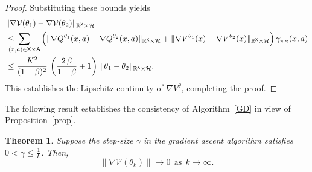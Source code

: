 \documentclass[11pt]{article}
\newcommand{\R}{\mathbb{R}}
\newcommand{\sX}{{\mathsf X}}
\newcommand{\sA}{{\mathsf A}}
\newcommand{\cH}{{\mathcal H}}
\newcommand{\V}{{\mathcal V}}
\newtheorem{theorem}{Theorem}[section]
\begin{document}
\begin{proof}
Substituting these bounds yields
\begin{align*}
&\|\nabla \V(\theta_1) - \nabla \V(\theta_2)\|_{\R^{\sX} \times \cH} \\
&\leq \hspace{-10pt} \sum_{(x,a) \in \sX \times \sA} \Big(\|\nabla Q^{\theta_1}(x,a) - \nabla Q^{\theta_2}(x,a)\|_{\R^{\sX} \times \cH} + \|\nabla V^{\theta_1}(x) - \nabla V^{\theta_2}(x)\|_{\R^{\sX} \times \cH}\Big) \, \gamma_{\pi_E}(x,a) \\
&\leq \frac{K^2}{(1-\beta)^2} \, \left(\frac{2  \, \beta}{1-\beta} + 1 \right) \, \| \theta_1 - \theta_2 \|_{\R^{\sX} \times \cH}.
\end{align*}
This establishes the Lipschitz continuity of $\nabla V^{\theta}$, completing the proof.
\end{proof}

The following result establishes the consistency of Algorithm~\ref{GD} in view of Proposition~\ref{prop}.

\begin{theorem}
Suppose the step-size $\gamma$ in the gradient ascent algorithm satisfies  $0<\gamma \leq \frac{1}{L}$. Then,
$$
\|\nabla \V(\theta_k)\| \rightarrow 0~~\text{as}~~ k \rightarrow \infty.
$$

\end{theorem}
\end{document}
